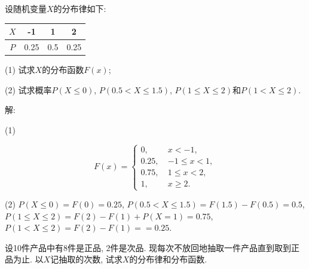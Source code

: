 \documentclass[standard]{ExBook}
\begin{document}
\begin{qitems}
\vspace{-5em}

    \begin{bbox}
    \begin{shaded}
        \qitem
设随机变量$X$的分布律如下: 
\begin{center}
\setlength{\tabcolsep}{30pt}
\begin{tabular}{c|ccc}
$X$ & -1 & 1 & 2\\
\hline
$P$ & 0.25 & 0.5 & 0.25\\
\end{tabular}
\end{center}
(1) 试求$X$的分布函数$F(x)$;

(2) 试求概率$P(X \leq 0)$, $P(0.5 < X  \leq 1.5)$, $P(1 \leq X \leq 2)$和$P(1 < X \leq 2)$.
    \end{shaded}
    \end{bbox}

\vspace{-5em}

    \begin{bbox}
解: 

(1)
\vspace{-2em}
\begin{center}
\begin{equation}
    F(x)=
    \left\{
    \begin{array}{cl}
        \nonumber
        0,\ &x < -1,\\
        0.25,\ &-1 \leq x < 1,\\
        0.75,\ &1 \leq x < 2,\\
        1,\ &x \geq 2.
    \end{array}
    \right.
\end{equation}
\end{center}
(2) $P(X \leq 0)=F(0)=0.25$, $P(0.5 < X  \leq 1.5)=F(1.5)-F(0.5)=0.5$, $P(1 \leq X \leq 2)=F(2)-F(1)+P(X=1)=0.75$, $P(1 < X \leq 2)=F(2)-F(1)==0.25$.
    \end{bbox}

\vspace{-5em}

    \begin{bbox}
    \begin{shaded}
        \qitem
设10件产品中有8件是正品, 2件是次品. 现每次不放回地抽取一件产品直到取到正品为止. 以$X$记抽取的次数, 试求$X$的分布律和分布函数.
    \end{shaded}
    \end{bbox}


\end{qitems}
\end{document}

